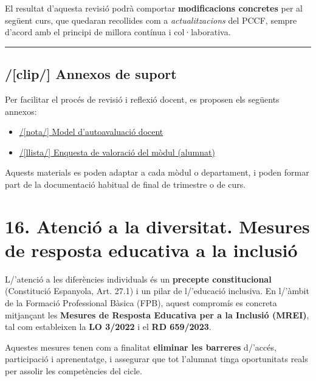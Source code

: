 \documentclass[
  paper=a4,
  ,captions=tableheading
]{scrartcl}
\providecommand{\tightlist}{%
  \setlength{\itemsep}{0pt}\setlength{\parskip}{0pt}}
\begin{document}
El resultat d'aquesta revisió podrà comportar \textbf{modificacions
concretes} per al següent curs, que quedaran recollides com a
\emph{actualitzacions} del PCCF, sempre d'acord amb el principi de
millora contínua i col·laborativa.

\begin{center}\rule{0.5\linewidth}{0.5pt}\end{center}

\hypertarget{clip-annexos-de-suport}{%
\subsection{/{[}clip/{]} Annexos de
suport}\label{clip-annexos-de-suport}}

Per facilitar el procés de revisió i reflexió docent, es proposen els
següents annexos:

\begin{itemize}
\tightlist
\item
  \href{../annexos/Annex-Autoavaluacio-Docent/}{/{[}nota/{]} Model
  d'autoavaluació docent}
\item
  \href{../annexos/Annex-Enquesta-Alumnat/}{/{[}llista/{]} Enquesta de
  valoració del mòdul (alumnat)}
\end{itemize}

Aquests materials es poden adaptar a cada mòdul o departament, i poden
formar part de la documentació habitual de final de trimestre o de curs.

\hypertarget{atenciuxf3-a-la-diversitat.-mesures-de-resposta-educativa-a-la-inclusiuxf3}{%
\section{16. Atenció a la diversitat. Mesures de resposta educativa a la
inclusió}\label{atenciuxf3-a-la-diversitat.-mesures-de-resposta-educativa-a-la-inclusiuxf3}}

L/'atenció a les diferències individuals és un \textbf{precepte
constitucional} (Constitució Espanyola, Art. 27.1) i un pilar de
l/'educació inclusiva. En l/'àmbit de la Formació Professional Bàsica
(FPB), aquest compromís es concreta mitjançant les \textbf{Mesures de
Resposta Educativa per a la Inclusió (MREI)}, tal com estableixen la
\textbf{LO 3/2022} i el \textbf{RD 659/2023}.

Aquestes mesures tenen com a finalitat \textbf{eliminar les barreres}
d/'accés, participació i aprenentatge, i assegurar que tot l'alumnat
tinga oportunitats reals per assolir les competències del cicle.
\end{document}
